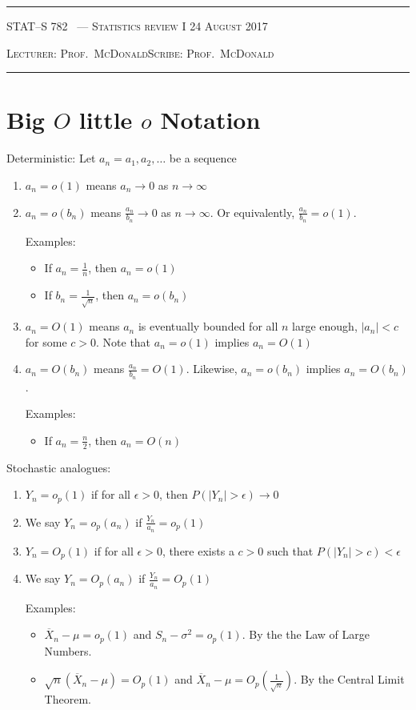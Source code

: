 \documentclass[10pt]{article}
\newcounter{lecnum}
\renewcommand{\bar}{\overline}
\newcommand{\lecturer}{Prof.\ McDonald}
\newcommand{\scribe}{Prof.\ McDonald}
\newcommand{\chtitle}{Statistics review I}
\newcommand{\lecdate}{24 August 2017}
\begin{document}
\rule{6.5in}{1pt}

\textsc{STAT--S 782
        \hfill \thelecnum\ --- \chtitle
        \hfill \lecdate}

\textsc{Lecturer: \lecturer \hfill Scribe: \scribe}
\rule{6.5in}{1pt}


\section{Big $O$ little $o$ Notation}
\label{sec:bigolittleo}
Deterministic: Let $a_n = a_1,a_2,\ldots$ be a sequence
\begin{enumerate}
\item $a_n = o(1)$ means $a_n\rightarrow0$ as $n\rightarrow\infty$
\item $a_n = o(b_n)$ means $\frac{a_n}{b_n}\rightarrow0$ as $n\rightarrow\infty$. Or equivalently, $\frac{a_n}{b_n} = o(1)$.

  Examples:
  \begin{itemize}
  \item If $a_n = \frac{1}{n}$, then $a_n = o(1)$
  \item   If $b_n = \frac{1}{\sqrt{n}}$, then $a_n = o(b_n)$
  \end{itemize}
\item $a_n = O(1)$ means $a_n$ is eventually bounded for all $n$
  large enough, $|a_n|<c$ for some $c>0$. Note that $a_n =
    o(1)$ implies $a_n = O(1)$
\item $a_n = O(b_n)$ means $\frac{a_n}{b_n} = O(1)$. Likewise, $a_n = o(b_n)$ implies $a_n = O(b_n)$.

  Examples:
  \begin{itemize}
  \item If $a_n = \frac{n}{2} $, then $a_n = O(n)$
  \end{itemize}
\end{enumerate}
Stochastic analogues:
\begin{enumerate}
\item $Y_n = o_p(1)$ if for all $\epsilon > 0$, then $P(|Y_n|>\epsilon)\rightarrow0$
\item We say $Y_n = o_p(a_n)$ if $\frac{Y_n}{a_n} = o_p(1)$
\item $Y_n = O_p(1)$ if for all $\epsilon > 0$, there exists a $c > 0$ such that $P(|Y_n|>c)<\epsilon$
\item We say $Y_n = O_p(a_n)$ if $\frac{Y_n}{a_n} = O_p(1)$

  Examples:
  \begin{itemize}
  \item $\bar{X}_n - \mu = o_p(1)$ and $S_n - \sigma^2 =
    o_p(1)$. By the the Law of Large Numbers.
  \item  $\sqrt{n}(\bar{X}_n-\mu) = O_p(1)$ and $\bar{X}_n-\mu =
    O_p(\frac{1}{\sqrt{n}})$. By the Central Limit
      Theorem.
  \end{itemize}
\end{enumerate}
\end{document}
